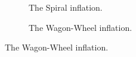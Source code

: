 \documentclass[aps, 10pt, english, twoside, pra, nofootinbib, tightenlines, longbibliography, superscriptaddress]{revtex4-1}
\begin{document}
    \begin{nscenter}
    \begin{figure}
    \begin{subfigure}[b]{.30\linewidth}
    \caption{The Spiral inflation.}\label{fig:spiral_inflation}
    \end{subfigure}
    \begin{subfigure}[b]{.30\linewidth}
    \caption{The Wagon-Wheel inflation.}\label{fig:wagon_wheel_inflation}
    \end{subfigure}

\end{figure}
\end{nscenter}
\end{document}
